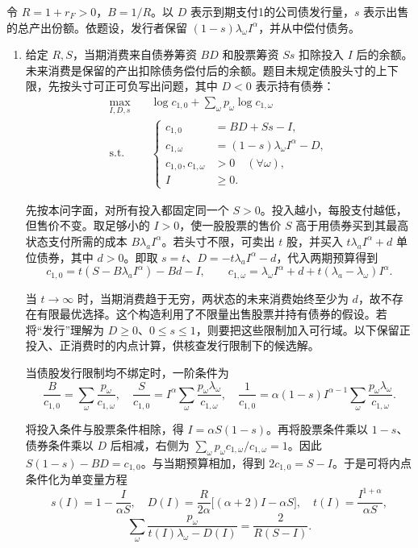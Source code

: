 \begin{solution}[blank-type=manual,blank-vsep=9\baselineskip]

令 $R=1+r_F>0$，$B=1/R$。以 $D$ 表示到期支付1的公司债发行量，$s$ 表示出售的总产出份额。依题设，发行者保留 $(1-s)\lambda_\omega I^\alpha$，并从中偿付债务。
\begin{enumerate}[label=(\alph*)]
\item 给定 $R,S$，当期消费来自债券筹资 $BD$ 和股票筹资 $Ss$ 扣除投入 $I$ 后的余额。未来消费是保留的产出扣除债务偿付后的余额。题目未规定债股头寸的上下限，先按头寸可正可负写出问题，其中 $D<0$ 表示持有债券：
\[
 \begin{aligned}
 \max_{I,D,s}\quad &\log c_{1,0}+\sum_\omega p_\omega\log c_{1,\omega}\\
 \text{s.t.}\quad &
 \left\{\begin{aligned}
 c_{1,0}&=BD+Ss-I,\\
 c_{1,\omega}&=(1-s)\lambda_\omega I^\alpha-D,\\
 c_{1,0},c_{1,\omega}&>0\quad(\forall\omega),\\
 I&\ge0.
 \end{aligned}\right.
 \end{aligned}
\]

先按本问字面，对所有投入都固定同一个 $S>0$。投入越小，每股支付越低，但售价不变。取足够小的 $I>0$，使一股股票的售价 $S$ 高于用债券买到其最高状态支付所需的成本 $B\lambda_a I^\alpha$。若头寸不限，可卖出 $t$ 股，并买入 $t\lambda_a I^\alpha+d$ 单位债券，其中 $d>0$。即取 $s=t$、$D=-t\lambda_a I^\alpha-d$，代入两期预算得到
\[
 c_{1,0}=t(S-B\lambda_a I^\alpha)-Bd-I,\qquad
 c_{1,\omega}=\lambda_\omega I^\alpha+d+t(\lambda_a-\lambda_\omega)I^\alpha.
\]

当 $t\to\infty$ 时，当期消费趋于无穷，两状态的未来消费始终至少为 $d$，故不存在有限最优选择。这个构造利用了不限量出售股票并持有债券的假设。若将“发行”理解为 $D\ge0$、$0\le s\le1$，则要把这些限制加入可行域。以下保留正投入、正消费时的内点计算，供核查发行限制下的候选解。

当债股发行限制均不绑定时，一阶条件为
\[
 \frac B{c_{1,0}}=\sum_\omega\frac{p_\omega}{c_{1,\omega}},\quad
 \frac S{c_{1,0}}=I^\alpha\sum_\omega\frac{p_\omega\lambda_\omega}{c_{1,\omega}},\quad
 \frac1{c_{1,0}}=\alpha(1-s)I^{\alpha-1}\sum_\omega\frac{p_\omega\lambda_\omega}{c_{1,\omega}}.
\]

将投入条件与股票条件相除，得 $I=\alpha S(1-s)$。再将股票条件乘以 $1-s$、债券条件乘以 $D$ 后相减，右侧为 $\sum_\omega p_\omega c_{1,\omega}/c_{1,\omega}=1$。因此 $S(1-s)-BD=c_{1,0}$。与当期预算相加，得到 $2c_{1,0}=S-I$。于是可将内点条件化为单变量方程
\[
 s(I)=1-\frac I{\alpha S},\quad
 D(I)=\frac R{2\alpha}\bigl[(\alpha+2)I-\alpha S\bigr],\quad
 t(I)=\frac{I^{1+\alpha}}{\alpha S},
\]
\[
 \sum_\omega\frac{p_\omega}{t(I)\lambda_\omega-D(I)}
 =\frac2{R(S-I)}.
\]


\end{enumerate}
\end{solution}
